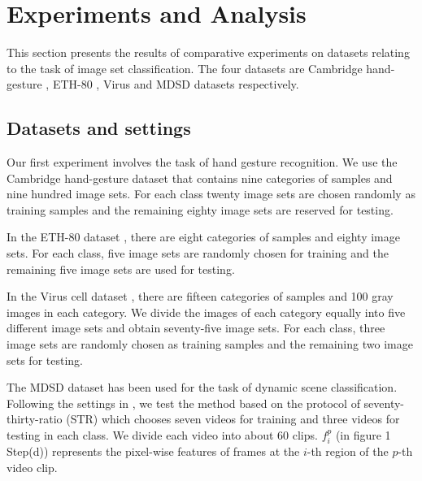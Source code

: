 \documentclass[review]{elsarticle}
\begin{document}
\section{Experiments and Analysis}
	 This section presents the results of  comparative experiments on datasets relating to the task of image set classification. The four datasets are Cambridge hand-gesture \cite{kim2009canonical}, ETH-80 \cite{leibe2003analyzing}, Virus \cite{kylberg2011virus} and MDSD \cite{shroff2010moving} datasets respectively.
\subsection{Datasets and settings}
	\indent Our first experiment involves the task of hand gesture recognition. We use the Cambridge hand-gesture dataset \cite{kim2009canonical} that contains nine categories of samples and nine hundred image sets. For each class twenty image sets are chosen randomly as training samples and the remaining eighty image sets are reserved for testing. 
	
	In the ETH-80 dataset \cite{leibe2003analyzing}, there are eight categories of samples and eighty image sets. For each class, five image sets are randomly chosen for training and the remaining five image sets are used for testing. 
	
	In the Virus cell dataset \cite{kylberg2011virus}, there are fifteen categories of samples and 100 gray images in each category. We divide the images of each category equally into five different image sets and obtain seventy-five image sets. For each class, three image sets are randomly chosen as training samples and the remaining two image sets for testing. 
	
	The MDSD dataset \cite{shroff2010moving} has been used for the task of dynamic scene classification. Following the settings in \cite{sun2017learning}, we test the method based on the protocol of seventy-thirty-ratio (STR) which chooses seven videos for training and three videos for testing in each class. We divide each video into about 60 clips.  $f_i^p$ (in figure 1 Step(d)) represents the pixel-wise features of frames at the $i$-th region of the $p$-th video clip.
	 
\end{document}
